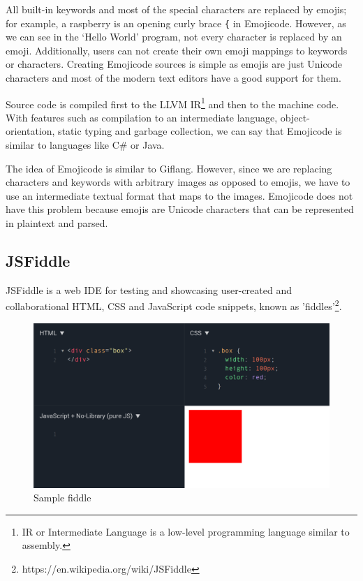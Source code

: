 All built-in keywords and most of the special characters are replaced by emojis; for example, a raspberry is an opening curly brace \texttt{\{} in Emojicode.
However, as we can see in the `Hello World' program, not every character is replaced by an emoji. Additionally, users can not create their own emoji
mappings to keywords or characters. Creating Emojicode sources is simple as emojis are just Unicode characters and most of the modern text editors
have a good support for them.

Source code is compiled first to the LLVM IR\footnote{IR or Intermediate Language is a low-level programming language similar to assembly.} and then to
the machine code. With features such as compilation to an intermediate language, object-orientation, static typing and garbage collection, we can
say that Emojicode is similar to languages like C\# or Java.

The idea of Emojicode is similar to Giflang. However, since we are replacing characters and keywords with arbitrary images as
opposed to emojis, we have to use an intermediate textual format that maps to the images. Emojicode does not have this problem because emojis are
Unicode characters that can be represented in plaintext and parsed.

\subsection{JSFiddle}
JSFiddle \cite{JSFiddle} is a web IDE for testing and showcasing user-created and collaborational HTML, CSS and JavaScript code snippets, known as
'fiddles'\footnote{https://en.wikipedia.org/wiki/JSFiddle}.

\begin{figure}[!hbt]
    \centering
	\includegraphics[width=\textwidth]{../img/jsfiddle}
	\caption{Sample fiddle}
	\label{fig:chap1:jsfiddle}
\end{figure}

